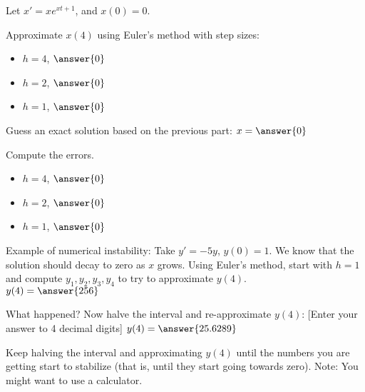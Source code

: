 \documentclass{ximera}
\begin{document}
\begin{exercise}%
    Let $x' = x e^{xt+1}$, and $x(0)=0$.
    
    Approximate $x(4)$ using Euler's method with step sizes:
    \begin{itemize}
        \item $h = 4$, $\answer{0}$
        \item $h = 2$, $\answer{0}$
        \item $h = 1$, $\answer{0}$
    \end{itemize}
    \begin{problem}
        Guess an exact solution based on the previous part: $x = \answer{0}$ 
        \begin{problem}
            Compute the errors.
        \begin{itemize}
            \item $h = 4$, $\answer{0}$
            \item $h = 2$, $\answer{0}$
            \item $h = 1$, $\answer{0}$
        \end{itemize}
        \end{problem}
    \end{problem}
\end{exercise}


\begin{exercise}
    Example of numerical instability: Take $y' = -5y$, $y(0) = 1$.  We know that the solution should decay to zero as $x$ grows. Using Euler's method, start with $h=1$ and compute $y_1, y_2, y_3, y_4$ to try to approximate $y(4)$.\\
    $y(4) = \answer{256}$
    
    \begin{problem}
        What happened? Now halve the interval and re-approximate $y(4)$: [Enter your answer to 4 decimal digits] $y(4) = \answer{25.6289}$
        \begin{feedback}[correct]
            Keep halving the interval and approximating $y(4)$ until the numbers you are getting start to stabilize (that is, until they start going towards zero). Note: You might want to use a calculator.
        \end{feedback}
    \end{problem}
\end{exercise}
\end{document}
